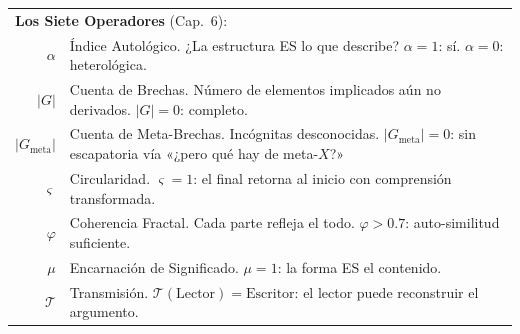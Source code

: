 \documentclass[10pt, openany, oneside]{book}
\renewcommand{\footnotesize}{\fontsize{8.5}{11}\selectfont}
\begin{document}
\vspace{0.5em}

{\footnotesize
\noindent\begin{tabular}{@{} r @{\hspace{0.6em}} p{} @{}}
\multicolumn{2}{l}{\textbf{Los Siete Operadores} (Cap.\ 6):} \\[0.3em]
$\alpha$ & Índice Autológico. ¿La estructura ES lo que describe? $\alpha = 1$: sí. $\alpha = 0$: heterológica. \\[0.3em]
$|G|$ & Cuenta de Brechas. Número de elementos implicados aún no derivados. $|G| = 0$: completo. \\[0.3em]
$|G_{\text{meta}}|$ & Cuenta de Meta-Brechas. Incógnitas desconocidas. $|G_{\text{meta}}| = 0$: sin escapatoria vía «¿pero qué hay de meta-$X$?» \\[0.3em]
$\varsigma$ & Circularidad. $\varsigma = 1$: el final retorna al inicio con comprensión transformada. \\[0.3em]
$\varphi$ & Coherencia Fractal. Cada parte refleja el todo. $\varphi > 0.7$: auto-similitud suficiente. \\[0.3em]
$\mu$ & Encarnación de Significado. $\mu = 1$: la forma ES el contenido. \\[0.3em]
$\mathcal{T}$ & Transmisión. $\mathcal{T}(\text{Lector}) = \text{Escritor}$: el lector puede reconstruir el argumento. \\[0.3em]
\end{tabular}
}

\vspace{0.5em}
\end{document}
